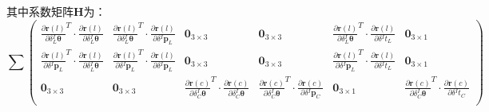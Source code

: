 其中系数矩阵$\boldsymbol{H}$为：
\begin{equation*}
  \sum\begin{pmatrix}
    \frac{\partial \boldsymbol{r}(l)}{\partial \delta {^{I}_{L}\boldsymbol{\theta}}}^T
    \cdot \frac{\partial \boldsymbol{r}(l)}{\partial \delta {^{I}_{L}\boldsymbol{\theta}}} &
    \frac{\partial \boldsymbol{r}(l)}{\partial \delta {^{I}_{L}\boldsymbol{\theta}}}^T
    \cdot \frac{\partial \boldsymbol{r}(l)}{\partial \delta {^{I}\boldsymbol{p}_L}}        &
    \boldsymbol{0}_{3\times 3}                                                             &
    \boldsymbol{0}_{3\times 3}                                                             &
    \frac{\partial \boldsymbol{r}(l)}{\partial \delta {^{I}_{L}\boldsymbol{\theta}}}^T
    \cdot \frac{\partial \boldsymbol{r}(l)}{\partial \delta {^{I}t_{L}}}                   &
    \boldsymbol{0}_{3\times 1}                                                               \\
    \frac{\partial \boldsymbol{r}(l)}{\partial \delta {^{I}\boldsymbol{p}_L}}^T
    \cdot \frac{\partial \boldsymbol{r}(l)}{\partial \delta {^{I}_{L}\boldsymbol{\theta}}} &
    \frac{\partial \boldsymbol{r}(l)}{\partial \delta {^{I}\boldsymbol{p}_L}}^T
    \cdot \frac{\partial \boldsymbol{r}(l)}{\partial \delta {^{I}\boldsymbol{p}_L}}        &
    \boldsymbol{0}_{3\times 3}                                                             &
    \boldsymbol{0}_{3\times 3}                                                             &
    \frac{\partial \boldsymbol{r}(l)}{\partial \delta {^{I}\boldsymbol{p}_L}}^T
    \cdot \frac{\partial \boldsymbol{r}(l)}{\partial \delta {^{I}t_{L}}}                   &
    \boldsymbol{0}_{3\times 1}                                                               \\
    \boldsymbol{0}_{3\times 3}                                                             &
    \boldsymbol{0}_{3\times 3}                                                             &
    \frac{\partial \boldsymbol{r}(c)}{\partial \delta {^{I}_{C}\boldsymbol{\theta}}}^T
    \cdot \frac{\partial \boldsymbol{r}(c)}{\partial \delta {^{I}_{C}\boldsymbol{\theta}}} &
    \frac{\partial \boldsymbol{r}(c)}{\partial \delta {^{I}_{C}\boldsymbol{\theta}}}^T
    \cdot \frac{\partial \boldsymbol{r}(c)}{\partial \delta {^{I}\boldsymbol{p}_C}}        &
    \boldsymbol{0}_{3\times 1}                                                             &
    \frac{\partial \boldsymbol{r}(c)}{\partial \delta {^{I}_{C}\boldsymbol{\theta}}}^T
    \cdot \frac{\partial \boldsymbol{r}(c)}{\partial \delta {^{I}t_{C}}}                     \\

\end{pmatrix}
\end{equation*}
